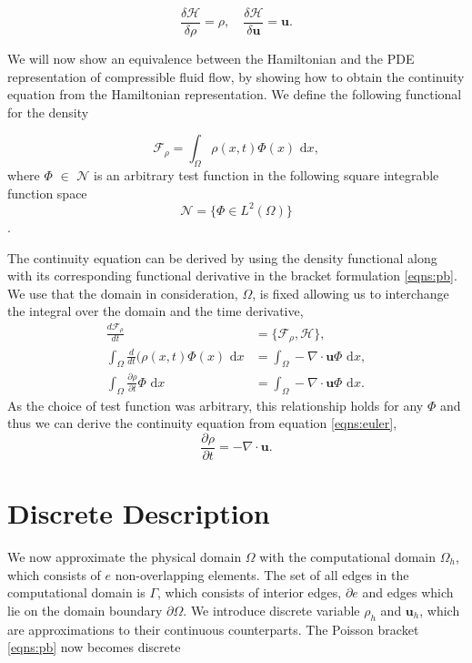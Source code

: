 \documentclass[a4paper,11pt]{article}
\begin{document}
\begin{equation}
\frac{\delta \mathcal{H}}{\delta \rho} =\rho, \quad
\frac{\delta \mathcal{H}}{\delta \mathbf{u}}= \mathbf{u}.
\end{equation}

We will now show an equivalence between the Hamiltonian and the PDE representation of compressible fluid flow, by showing how to obtain the continuity equation from the Hamiltonian representation. We define the following functional for the density

\[\mathcal{F}_\rho = \int_\Omega \rho (x,t) \Phi (x) \text{ d}x,\]
 where $\Phi$ $\in$ $\mathcal{N}$ is an arbitrary test function in the following square integrable function space
\[\mathcal{N} = \{ \Phi \in L^2(\Omega) \} \].

The continuity equation can be derived  by using the density functional along with its corresponding functional derivative in the bracket formulation \eqref{eqns:pb}.  We use that the domain in consideration, $\Omega$,  is fixed allowing us to interchange the  integral over the domain and the time derivative, 
\begin{equation}\label{functionalsderivs}
\begin{aligned}
\frac{d \mathcal{F}_\rho}{dt} &= \{\mathcal{F}_\rho, \mathcal{H} \},\\
\int_\Omega \frac{d}{dt}(\rho (x,t)  \Phi (x  ) \text{ d}x&=\int_\Omega - \nabla \cdot \mathbf{u} \Phi \text{ d}x,\\
\int_\Omega \frac{\partial \rho}{\partial t}\Phi  \text{ d}x&= \int_\Omega -\nabla \cdot \mathbf{u} \Phi \text{ d}x.
\end{aligned}
\end{equation}
As the choice of test function was arbitrary, this relationship holds for any $\Phi$ and thus we can derive the continuity equation  from equation \eqref{eqns:euler},
\begin{equation}
 \frac{\partial \rho}{\partial t} = - \nabla \cdot \mathbf{u}.
\end{equation}


\section{ Discrete Description}

 We now approximate the physical domain $\Omega$ with the computational domain $\Omega_h$, which consists of $e$ non-overlapping elements. The set of all edges in the computational domain is $\Gamma$, which consists of interior edges, $\partial e $ and edges which lie on the domain boundary $\partial \Omega$. We introduce discrete variable $\rho_h$ and $\mathbf{u}_h$, which are approximations to their continuous counterparts. The Poisson bracket \eqref{eqns:pb} now becomes discrete
\end{document}
